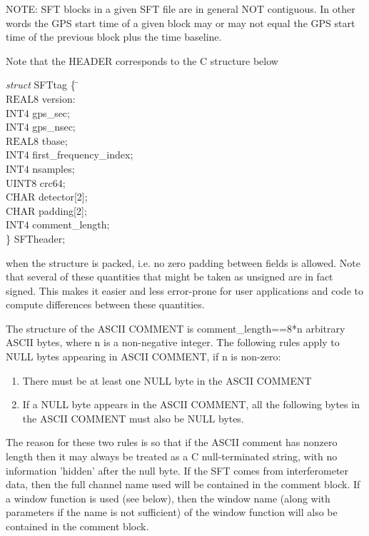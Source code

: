\documentclass{ligodcc}
\begin{document}
NOTE: SFT blocks in a given SFT file are in general NOT contiguous.
In other words the GPS start time of a given block may or may not
equal the GPS start time of the previous block plus the time baseline.


Note that the HEADER corresponds to the C structure below
\begin{tabbing}
\hspace{1cm} \= {\em struct} SFTtag \{ \hspace{1cm} \= \hspace{2cm} \= \\
\> \>  $\mathrm{REAL8}$  \> version:\\
\> \>   $\mathrm{INT4}$  \> gps\_sec;\\
\> \>   $\mathrm{INT4}$  \>  gps\_nsec;\\
\> \>   $\mathrm{REAL8}$ \>  tbase;\\
\> \>   $\mathrm{INT4}$  \>  first\_frequency\_index;\\
\> \>   $\mathrm{INT4}$  \>  nsamples;\\
\> \>   $\mathrm{UINT8}$ \>  crc64;\\
\> \>   $\mathrm{CHAR}$  \>  detector[2];\\	
\> \>   $\mathrm{CHAR}$  \>  padding[2];\\
\> \>   $\mathrm{INT4}$  \>  comment\_length;\\
\> \} SFTheader;
\end{tabbing}
when the structure is packed, i.e. no zero padding between fields is
allowed.  Note that several of these quantities that might be taken as
unsigned are in fact signed.  This makes it easier and less
error-prone for user applications and code to compute differences
between these quantities.

The structure of the ASCII COMMENT is comment\_length==8*n arbitrary
ASCII bytes, where n is a non-negative integer.  The following rules
apply to NULL bytes appearing in ASCII COMMENT, if n is non-zero:
\begin{enumerate}
\item There must be at least one NULL byte in the ASCII COMMENT
\item If a NULL byte appears in the ASCII COMMENT, all the following
    bytes in the ASCII COMMENT must also be NULL bytes.
\end{enumerate}
The reason for these two rules is so that if the ASCII comment has
nonzero length then it may always be treated as a C null-terminated
string, with no information 'hidden' after the null byte.
If the SFT comes from interferometer data, then the full channel name
used will be contained in the comment block.  If a window function is
used (see below), then the window name (along with parameters if the
name is not sufficient) of the window function will also be contained
in the comment block.
\end{document}
